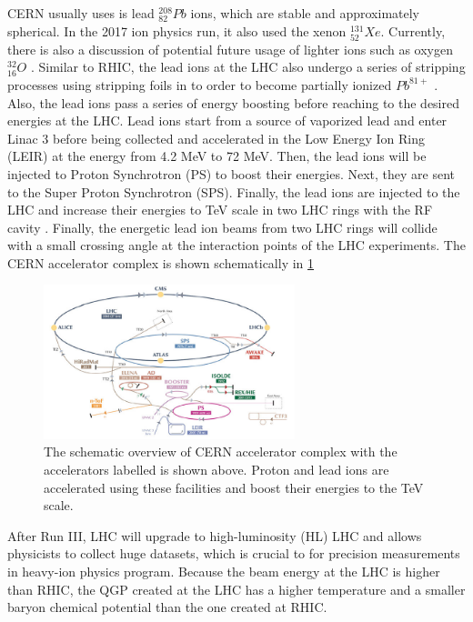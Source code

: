 CERN usually uses is lead ${}^{208}_{82} Pb$ ions, which are stable and approximately spherical. In the 2017 ion physics run, it also used the xenon ${}^{131}_{52} Xe$. Currently, there is also a discussion of potential future usage of lighter ions such as oxygen ${}^{32}_{16} O$ \cite{OORun}. Similar to RHIC, the lead ions at the LHC also undergo a series of stripping processes using stripping foils in to order to become partially ionized $Pb^{81+}$ \cite{LHCStrip}. Also, the lead ions pass a series of energy boosting before reaching to the desired energies at the LHC. Lead ions start from a source of vaporized lead and enter Linac 3 before being collected and accelerated in the Low Energy Ion Ring (LEIR) at the energy from 4.2 MeV to 72 MeV. Then, the lead ions will be injected to Proton Synchrotron (PS) to boost their energies. Next, they are sent to the Super Proton Synchrotron (SPS). Finally, the lead ions are injected to the LHC and increase their energies to TeV scale in two LHC rings with the RF cavity \cite{LHCReport}. Finally, the energetic lead ion beams from two LHC rings will collide with a small crossing angle at the interaction points of the LHC experiments. The CERN accelerator complex is shown schematically in \ref{CERNAccComplex} 


\begin{figure}[hbtp]
\begin{center}
\includegraphics[width=0.65\textwidth]{Figures/Chapter1/CERNAccComplex.jpg}
\caption{The schematic overview of CERN accelerator complex with the accelerators labelled is shown above. Proton and lead ions are accelerated using these facilities and boost their energies to the TeV scale.}
\label{CERNAccComplex}
\end{center}
\end{figure} 

After Run III, LHC will upgrade to high-luminosity (HL) LHC and allows physicists to collect huge datasets, which is crucial to for precision measurements in heavy-ion physics program. Because the beam energy at the LHC is higher than RHIC, the QGP created at the LHC has a higher temperature and a smaller baryon chemical potential than the one created at RHIC.  

